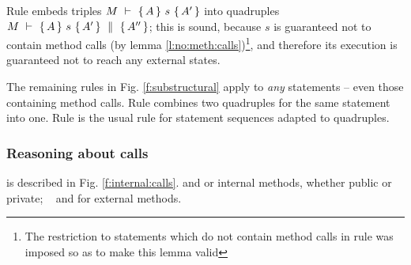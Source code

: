 {Rule {} embeds  triples  ${\hproves{M}  {A} {\ s\ }{A'} }$  into quadruples ${M\ \vdash\ \{\,A\, \} \ s\  \{\,A'\, \}\, \,\parallel\,\, \{\, A'' \, \} }$; this is sound, because $s$ is guaranteed not to contain method calls (by lemma \ref{l:no:meth:calls})\footnote{The restriction to statements which do not contain method calls in rule {} was imposed so as to make this lemma valid}, and therefore its execution is guaranteed not to reach any external states.

 
The remaining rules in Fig. \ref{f:substructural} apply to \emph{any} statements -- even those containing method calls.
Rule {} combines two quadruples for the same statement into one.
Rule   {}is the usual rule  for statement sequences  adapted to quadruples.



\subsubsection{Reasoning about   calls}
\label{s:calls}
is described in Fig. \ref{f:internal:calls}. {}  and {}  or internal methods, whether public or private;  \  {} 
and {} for  external methods.


}
